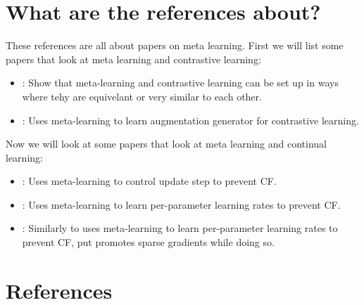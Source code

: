 \documentclass{article}
\author{by Henry Bourne}
\date{\today}
\newcommand{\setfoldernameastitle}{%
  \begingroup
  \edef\x{\endgroup\noexpand\title{\currfilebase}}\x
}
\begin{document}
\setfoldernameastitle %

\maketitle

\section{What are the references about?}
These references are all about papers on meta learning. First we will list some papers that look at meta learning and contrastive learning:

\begin{itemize}
  \item \cite{ni2021close}: Show that meta-learning and contrastive learning can be set up in ways where tehy are equivelant or very similar to each other.
  \item \cite{li2022metaug}: Uses meta-learning to learn augmentation generator for contrastive learning.
\end{itemize}

Now we will look at some papers that look at meta learning and continual learning:
\begin{itemize}
  \item \cite{vuorio2018meta}: Uses meta-learning to control update step to prevent CF.
  \item \cite{gupta2020look}: Uses meta-learning to learn per-parameter learning rates to prevent CF.
  \item \cite{von2021learning}: Similarly to \cite{gupta2020look} uses meta-learning to learn per-parameter learning rates to prevent CF, put promotes sparse gradients while doing so. 
\end{itemize}


\section{References}
\end{document}
